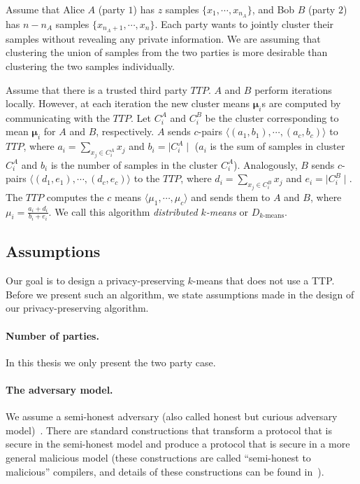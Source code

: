 Assume that Alice $A$ (party $1$) has $z$ samples $\{
x_1,\cdots,x_{n_A} \}$, and Bob $B$ (party $2$) has $n-n_A$ samples
$\{ x_{n_A + 1},\cdots,x_n \}$. Each party wants to jointly cluster
their samples without revealing any private information. We are
assuming that clustering the union of samples from the two parties is
more desirable than clustering the two samples individually.

Assume that there is a trusted third party $TTP$. $A$ and $B$ perform
iterations locally. However, at each iteration the new cluster means
$\mathbf{\mu}_i$s are computed by communicating with the $TTP$. Let
$C_i^A$ and $C_i^B$ be the cluster corresponding to mean
$\mathbf{\mu}_i$ for $A$ and $B$, respectively.  $A$ sends $c$-pairs
$\langle (a_1,b_1), \cdots, (a_c,b_c) \rangle$ to $TTP$, where $a_i =
\sum_{x_j \in C_i^A } x_j$ and $b_i = \mid C_i^A \mid$ ($a_i$ is the sum of
samples in cluster $C_i^A$ and $b_i$ is the number of samples in the
cluster $C_i^A$). Analogously, $B$ sends $c$-pairs $\langle (d_1,e_1),
\cdots, (d_c,e_c) \rangle$ to the $TTP$, where $d_i = \sum_{x_j \in
C_i^B } x_j$ and $e_i = \mid C_i^B \mid$. The $TTP$ computes the $c$
means $\langle \mu_1, \cdots, \mu_c \rangle$ and sends them to $A$ and
$B$, where $\mu_i = \frac{a_i+d_i}{b_i+e_i}$. We call this algorithm
{\em distributed $k$-means} or $D_{\mbox{$k$-means}}$.

\subsection{Assumptions}

Our goal is to design a privacy-preserving $k$-means that does not
use a TTP. Before we present such an algorithm, we state assumptions
made in the design of our  privacy-preserving algorithm.

\paragraph{Number of parties.} In this thesis we only present the
two party case. 

\paragraph{The adversary model.} We assume a  semi-honest
adversary (also called honest but curious adversary model)~\cite{Goldreich:vol2}.
There are standard constructions that transform a protocol that
is secure in the semi-honest model and produce a protocol that is
secure in a more general malicious model (these constructions are
called ``semi-honest to malicious'' compilers, and details of these
constructions can be found in~\cite{Goldreich:compiler:99}).

